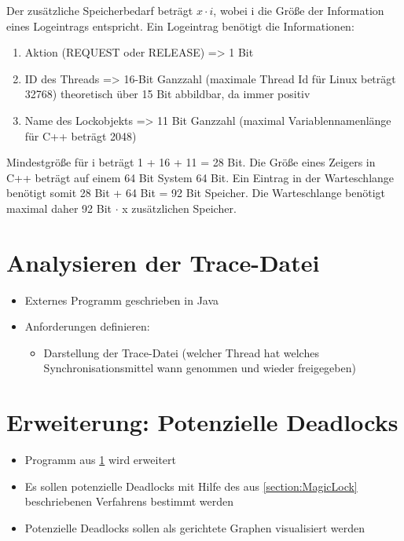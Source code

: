 \begin{itemize}
    Der zusätzliche Speicherbedarf beträgt $x \cdot i$, wobei i die Größe der Information eines Logeintrags entspricht.
    Ein Logeintrag benötigt die Informationen:
    \begin{enumerate}
      \item Aktion (REQUEST oder RELEASE) => 1 Bit
      \item ID des Threads => 16-Bit Ganzzahl (maximale Thread Id für Linux beträgt 32768) theoretisch über 15 Bit abbildbar, da immer positiv
      \item Name des Lockobjekts => 11 Bit Ganzzahl (maximal Variablennamenlänge für C++ beträgt 2048)
    \end{enumerate}
    Mindestgröße für i beträgt 1 + 16 + 11 = 28 Bit.
    Die Größe eines Zeigers in C++ beträgt auf einem 64 Bit System 64 Bit.
    Ein Eintrag in der Warteschlange benötigt somit 28 Bit + 64 Bit = 92 Bit Speicher.
    Die Warteschlange benötigt maximal daher 92 Bit $\cdot$ x zusätzlichen Speicher.
\end{itemize}

\section{Analysieren der Trace-Datei}
\label{section:Analysieren der Trace-Datei}
\begin{itemize}
  \item Externes Programm geschrieben in Java
  \item Anforderungen definieren:
  \begin{itemize}
    \item Darstellung der Trace-Datei (welcher Thread hat welches
    Synchronisationsmittel wann genommen und wieder freigegeben) 
  \end{itemize}
\end{itemize}

\section{Erweiterung: Potenzielle Deadlocks}
\label{section:Erweiterung: Potenzielle Deadlocks}
\begin{itemize}
  \item Programm aus \cref{section:Analysieren der Trace-Datei} wird erweitert
  \item Es sollen potenzielle Deadlocks mit Hilfe des aus \cref{section:MagicLock}
 beschriebenen Verfahrens bestimmt werden
  \item Potenzielle Deadlocks sollen als gerichtete Graphen visualisiert werden
\end{itemize}